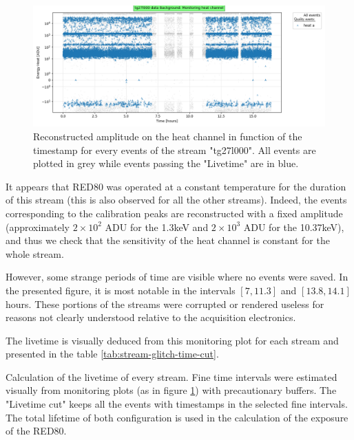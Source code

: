\begin{figure}
\centering
\includegraphics[width=\linewidth,]{Figures/Neutron/analysis_glitch_cut_demo.png}
\caption{Reconstructed amplitude on the heat channel in function of the timestamp for every events of the stream "tg27l000". All events are plotted in grey while events passing the "Livetime" are in blue.}
\label{fig:analysis-monitoring-demo}
\end{figure}

It appears that RED80 was operated at a constant temperature for the duration of this stream (this is also observed for all the other streams). Indeed, the events corresponding to the calibration peaks are reconstructed with a fixed amplitude (approximately $2 \times 10^2$ ADU for the 1.3keV and $2 \times 10^3$ ADU for the 10.37keV), and thus we check that the sensitivity of the heat channel is constant for the whole stream.

However, some strange periods of time are visible where no events were saved. In the presented figure, it is most notable in the intervals $[7, 11.3]$ and $[13.8, 14.1]$ hours. These portions of the streams were corrupted or rendered useless for reasons not clearly understood relative to the acquisition electronics.

The livetime is visually deduced from this monitoring plot for each stream and presented in the table \ref{tab:stream-glitch-time-cut}.

\begin{table}[]
\centering
\resizebox{\linewidth}{!}{
	
}
\caption{Calculation of the livetime of every stream. Fine time intervals were estimated visually from monitoring plots (as in figure \ref{fig:analysis-monitoring-demo}) with precautionary buffers. The "Livetime cut" keeps all the events with timestamps in the selected fine intervals. The total lifetime of both configuration is used in the calculation of the exposure of the RED80.}
\label{tab:stream-glitch-time-cut}
\end{table}

